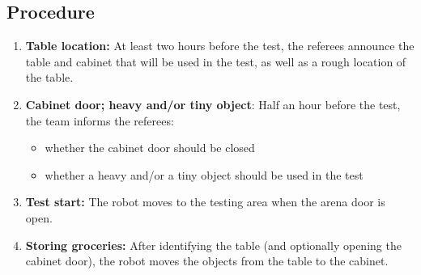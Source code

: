 \subsection*{Procedure}
\begin{enumerate}[nosep]
	\item \textbf{Table location:} At least two hours before the test, the referees announce the table and cabinet that will be used in the test, as well as a rough location of the table.
	\item \textbf{Cabinet door; heavy and/or tiny object}: Half an hour before the test, the team informs the referees:
		\begin{itemize}
			\item whether the cabinet door should be closed
			\item whether a heavy and/or a tiny object should be used in the test
		\end{itemize}
	\item \textbf{Test start:} The robot moves to the testing area when the arena door is open.
	\item \textbf{Storing groceries:} After identifying the table (and optionally opening the cabinet door), the robot moves the objects from the table to the cabinet.
\end{enumerate}


